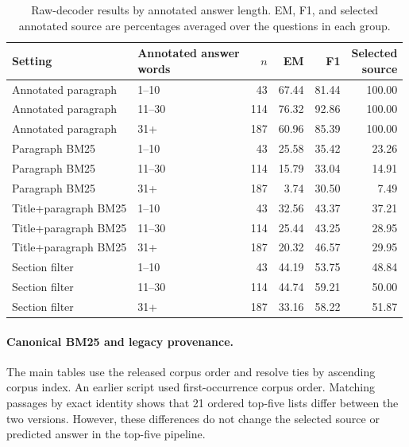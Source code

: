\documentclass[pdflatex,sn-basic]{sn-jnl}%
\theoremstyle{thmstyleone}%
\theoremstyle{thmstyletwo}%
\theoremstyle{thmstylethree}%
\begin{document}
\begin{table}[!htbp]
    \caption{Raw-decoder results by annotated answer length. EM, F1, and
    selected annotated source are percentages averaged over the questions in
    each group.}
    \label{tab:answer_length_scores}
    \centering
    \scriptsize
    \setlength{\tabcolsep}{4pt}
    \begin{tabular}{@{}l@{\hspace{6pt}}l|rrrr@{}}
        \toprule
        Setting & \shortstack{Annotated answer\\words}
        & $n$ & EM & F1 & \shortstack{Selected\\source} \\
        \midrule
        Annotated paragraph & 1--10  & 43  & 67.44 & 81.44 & 100.00 \\
        Annotated paragraph & 11--30 & 114 & 76.32 & 92.86 & 100.00 \\
        Annotated paragraph & 31+    & 187 & 60.96 & 85.39 & 100.00 \\
        \midrule
        Paragraph BM25 & 1--10  & 43  & 25.58 & 35.42 & 23.26 \\
        Paragraph BM25 & 11--30 & 114 & 15.79 & 33.04 & 14.91 \\
        Paragraph BM25 & 31+    & 187 & 3.74  & 30.50 & 7.49 \\
        \midrule
        Title+paragraph BM25 & 1--10  & 43  & 32.56 & 43.37 & 37.21 \\
        Title+paragraph BM25 & 11--30 & 114 & 25.44 & 43.25 & 28.95 \\
        Title+paragraph BM25 & 31+    & 187 & 20.32 & 46.57 & 29.95 \\
        \midrule
        Section filter & 1--10  & 43  & 44.19 & 53.75 & 48.84 \\
        Section filter & 11--30 & 114 & 44.74 & 59.21 & 50.00 \\
        Section filter & 31+    & 187 & 33.16 & 58.22 & 51.87 \\
        \bottomrule
    \end{tabular}
\end{table}

\paragraph*{Canonical BM25 and legacy provenance.}
The main tables use the released corpus order and resolve ties by ascending
corpus index. An earlier script used first-occurrence corpus order. Matching
passages by exact identity shows that 21 ordered top-five lists differ between
the two versions. However, these differences do not change the selected source
or predicted answer in the top-five pipeline.
\end{document}
